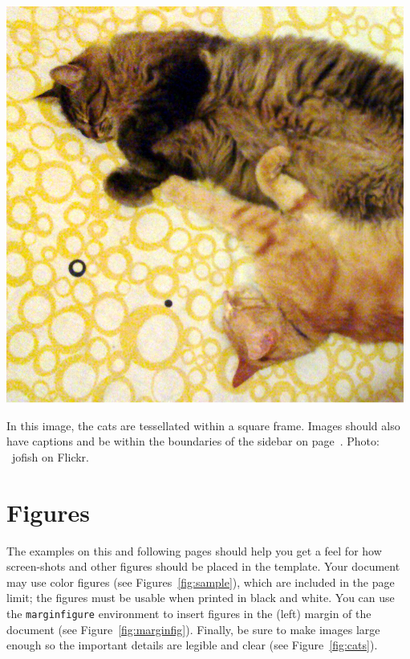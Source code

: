 \documentclass[sigchi-a, authorversion]{acmart}
\begin{document}
\begin{marginfigure}
    \includegraphics[width=\marginparwidth]{cats}
    \caption{In this image, the cats are tessellated within a square
      frame. Images should also have captions and be within the
      boundaries of the sidebar on page~\pageref{bar:sidebar}. Photo:
      \cczero~jofish on Flickr.}
    \label{fig:marginfig}
\end{marginfigure}

\section{Figures}
The examples on this and following pages should help you get a feel
for how screen-shots and other figures should be placed in the
template. Your document may use color figures (see
Figures~\ref{fig:sample}), which are included in the page limit; the
figures must be usable when printed in black and white. You can use
the \texttt{marginfigure} environment to insert figures in the (left) margin
of the document (see Figure~\ref{fig:marginfig}). Finally, be sure to
make images large enough so the important details are legible and
clear (see Figure~\ref{fig:cats}).
\end{document}
